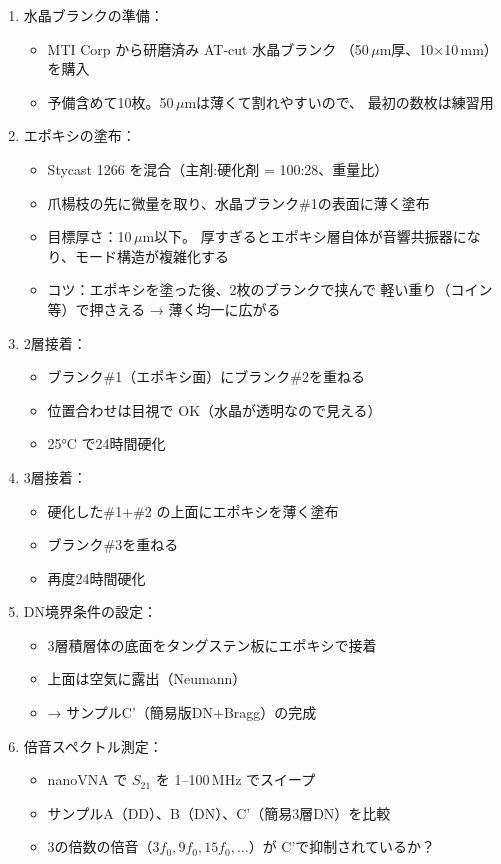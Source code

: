 \documentclass[11pt,a4paper]{article}
\def\textbf#1{#1}%
\begin{document}
\begin{enumerate}[leftmargin=*]
\item \textbf{水晶ブランクの準備}：
  \begin{itemize}
  \item MTI Corp から研磨済み AT-cut 水晶ブランク
    （50\,$\mu$m厚、10$\times$10\,mm）を購入
  \item 予備含めて10枚。50\,$\mu$mは薄くて割れやすいので、
    最初の数枚は練習用
  \end{itemize}

\item \textbf{エポキシの塗布}：
  \begin{itemize}
  \item Stycast 1266 を混合（主剤:硬化剤 = 100:28、重量比）
  \item 爪楊枝の先に微量を取り、水晶ブランク\#1の表面に薄く塗布
  \item \textbf{目標厚さ：10\,$\mu$m以下}。
    厚すぎるとエポキシ層自体が音響共振器になり、モード構造が複雑化する
  \item コツ：エポキシを塗った後、2枚のブランクで挟んで
    軽い重り（コイン等）で押さえる → 薄く均一に広がる
  \end{itemize}

\item \textbf{2層接着}：
  \begin{itemize}
  \item ブランク\#1（エポキシ面）にブランク\#2を重ねる
  \item 位置合わせは目視で OK（水晶が透明なので見える）
  \item 25°C で24時間硬化
  \end{itemize}

\item \textbf{3層接着}：
  \begin{itemize}
  \item 硬化した\#1+\#2 の上面にエポキシを薄く塗布
  \item ブランク\#3を重ねる
  \item 再度24時間硬化
  \end{itemize}

\item \textbf{DN境界条件の設定}：
  \begin{itemize}
  \item 3層積層体の底面をタングステン板にエポキシで接着
  \item 上面は空気に露出（Neumann）
  \item → サンプルC'（簡易版DN+Bragg）の完成
  \end{itemize}

\item \textbf{倍音スペクトル測定}：
  \begin{itemize}
  \item nanoVNA で $S_{21}$ を 1--100\,MHz でスイープ
  \item サンプルA（DD）、B（DN）、C'（簡易3層DN）を比較
  \item 3の倍数の倍音（$3f_0, 9f_0, 15f_0, \ldots$）が
    C'で抑制されているか？
  \end{itemize}
\end{enumerate}
\end{document}
